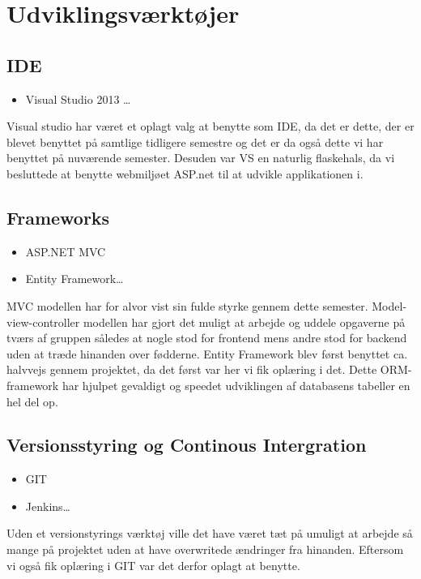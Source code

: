 \section{Udviklingsværktøjer} 


\subsection*{IDE}
\begin{itemize}
  \item Visual Studio 2013 \ldots
\end{itemize}
Visual studio har været et oplagt valg at benytte som IDE, da det er dette, der er blevet benyttet på samtlige tidligere semestre og det er da også dette vi har benyttet på nuværende semester. Desuden var VS en naturlig flaskehals, da vi besluttede at benytte webmiljøet ASP.net til at udvikle applikationen i.

\subsection*{Frameworks} 
\begin{itemize}
  \item ASP.NET MVC
  \item Entity Framework\ldots
\end{itemize}
MVC modellen har for alvor vist sin fulde styrke gennem dette semester. Model-view-controller modellen har gjort det muligt at arbejde og uddele opgaverne på tværs af gruppen således at nogle stod for frontend mens andre stod for backend uden at træde hinanden over fødderne.
Entity Framework blev først benyttet ca. halvvejs gennem projektet, da det først var her vi fik oplæring i det. Dette ORM-framework har hjulpet gevaldigt og speedet udviklingen af databasens tabeller en hel del op.  

\subsection*{Versionsstyring og Continous Intergration} 
\begin{itemize}
  \item GIT
  \item Jenkins\ldots
\end{itemize}
Uden et versionstyrings værktøj ville det have været tæt på umuligt at arbejde så mange på projektet uden at have overwritede ændringer fra hinanden. Eftersom vi også fik oplæring i GIT var det derfor oplagt at benytte.

